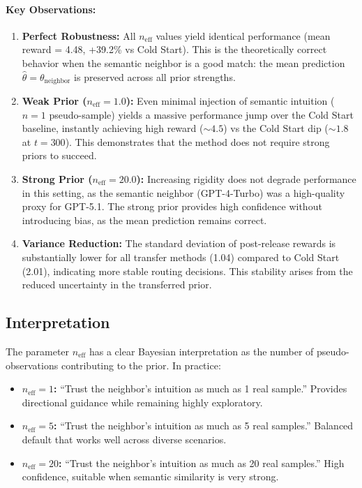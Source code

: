 \paragraph{Key Observations:}

\begin{enumerate}[leftmargin=*]
    \item \textbf{Perfect Robustness:} All $n_{\text{eff}}$ values yield identical 
    performance (mean reward = 4.48, +39.2\% vs Cold Start). This is the theoretically 
    correct behavior when the semantic neighbor is a good match: the mean prediction 
    $\hat{\theta} = \theta_{\text{neighbor}}$ is preserved across all prior strengths.
    
    \item \textbf{Weak Prior ($n_{\text{eff}}=1.0$):} Even minimal injection of 
    semantic intuition ($n=1$ pseudo-sample) yields a massive performance jump over 
    the Cold Start baseline, instantly achieving high reward ($\sim 4.5$) vs the 
    Cold Start dip ($\sim 1.8$ at $t=300$). This demonstrates that the method does 
    not require strong priors to succeed.
    
    \item \textbf{Strong Prior ($n_{\text{eff}}=20.0$):} Increasing rigidity does 
    not degrade performance in this setting, as the semantic neighbor (GPT-4-Turbo) 
    was a high-quality proxy for GPT-5.1. The strong prior provides high confidence 
    without introducing bias, as the mean prediction remains correct.
    
    \item \textbf{Variance Reduction:} The standard deviation of post-release rewards 
    is substantially lower for all transfer methods (1.04) compared to Cold Start (2.01), 
    indicating more stable routing decisions. This stability arises from the reduced 
    uncertainty in the transferred prior.
\end{enumerate}

\subsection{Interpretation}

The parameter $n_{\text{eff}}$ has a clear Bayesian interpretation as the number 
of pseudo-observations contributing to the prior. In practice:

\begin{itemize}[leftmargin=*,noitemsep]
    \item \textbf{$n_{\text{eff}} = 1$:} ``Trust the neighbor's intuition as much 
    as 1 real sample.'' Provides directional guidance while remaining highly exploratory.
    
    \item \textbf{$n_{\text{eff}} = 5$:} ``Trust the neighbor's intuition as much 
    as 5 real samples.'' Balanced default that works well across diverse scenarios.
    
    \item \textbf{$n_{\text{eff}} = 20$:} ``Trust the neighbor's intuition as much 
    as 20 real samples.'' High confidence, suitable when semantic similarity is very strong.
\end{itemize}

